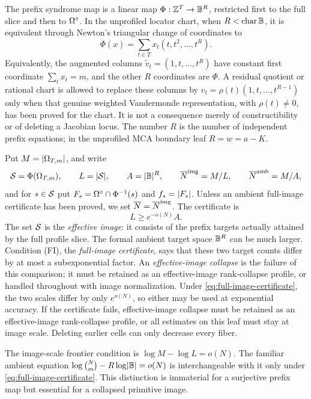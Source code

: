 \documentclass[11pt,a4paper]{amsart}
\numberwithin{equation}{section}
\theoremstyle{remark}
\begin{document}
The prefix syndrome map is a linear map \(\Phi:\mathbb Z^T\to\mathbb B^R\), restricted
first to the full slice and then to \(\Omega^{\circ}\).  In the unprofiled locator
chart, when \(R<\operatorname{char}\mathbb B\), it is equivalent through Newton's
triangular change of coordinates to
\begin{equation}
        \Phi(x)=\sum_{t\in T}x_t(t,t^2,\ldots,t^R).
        \label{eq:exact-power-sum-map}
\end{equation}
Equivalently, the augmented columns
\(\widetilde v_t=(1,t,\ldots,t^R)\) have constant first coordinate
\(\sum_tx_t=m\), and the other \(R\) coordinates are \(\Phi\).  A residual
quotient or rational chart is allowed to replace these columns by
\(v_t=\rho(t)(1,t,\ldots,t^{R-1})\) only when that genuine weighted
Vandermonde representation, with \(\rho(t)\ne0\), has been proved for the
chart.  It is not a consequence merely of constructibility or of deleting
a Jacobian locus.  The number \(R\) is the number of independent prefix
equations; in the unprofiled MCA boundary leaf \(R=w=a-K\).

Put \(M=\lvert \Omega_{T,m}\rvert\), and write
\begin{equation}
 \mathcal S=\Phi(\Omega_{T,m}),\qquad L=\lvert \mathcal S\rvert,
 \qquad A=\lvert \mathbb B\rvert^R,
 \qquad \overline N^{\rm img}=M/L,
 \qquad \overline N^{\rm amb}=M/A,
 \label{eq:image-ambient-scales}
\end{equation}
and for \(s\in\mathcal S\) put
\(F_s=\Omega^{\circ}\cap\Phi^{-1}(s)\) and \(f_s=\lvert F_s\rvert\).  Unless an
ambient full-image certificate has been proved, we set
\(\overline N=\overline N^{\rm img}\).  The certificate is
\[
        L\ge e^{-o(N)}A.                       \tag{FI}\label{eq:full-image-certificate}
\]
The set \(\mathcal S\) is the \emph{effective image}: it consists of the
prefix targets actually attained by the full profile slice.  The formal
ambient target space \(\mathbb B^R\) can be much larger.  Condition \textup{(FI)},
the \emph{full-image certificate}, says that these two target counts differ
by at most a subexponential factor.  An \emph{effective-image collapse} is
the failure of this comparison; it must be retained as an effective-image
rank-collapse profile, or handled throughout with image normalization.
Under \eqref{eq:full-image-certificate}, the two scales differ by only
\(e^{o(N)}\), so either may be used at exponential accuracy.  If the
certificate fails, effective-image collapse must be retained as an
effective-image rank-collapse profile, or all estimates on this leaf must stay
at image scale.  Deleting earlier cells can only decrease every fiber.

The image-scale frontier condition is
\(\log M-\log L=o(N)\).  The familiar ambient equation
\(\log\binom Nm-R\log\lvert \mathbb B\rvert=o(N)\) is interchangeable with it only under
\eqref{eq:full-image-certificate}.  This distinction is immaterial for a
surjective prefix map but essential for a collapsed primitive image.
\end{document}
